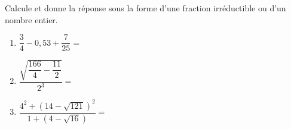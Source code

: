 \medskip
Calcule et donne la réponse sous la forme d'une fraction irréductible ou d'un nombre entier. 
\begin{enumerate}
\setlength\itemsep{1em}
\item $\dfrac{3}{4}-0,53+\dfrac{7}{25}=$
\item $\dfrac{\sqrt{\dfrac{166}{4}-\dfrac{11}{2}}}{2^3}=$
\item $\dfrac{4^2+(14-\sqrt{121})^2}{1+(4-\sqrt{16})}=$
\end{enumerate}